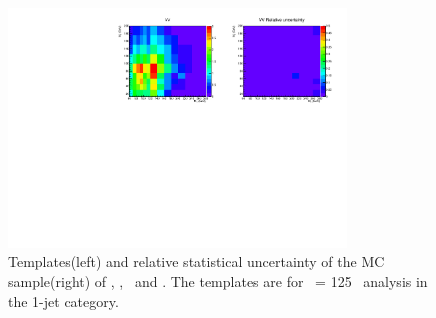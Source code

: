 \begin{figure}[htp]
\includegraphics[width=0.8\textwidth]{figures/2dtemplate_VV_mH125_1j.pdf}
\caption{Templates(left) and relative statistical uncertainty of the MC sample(right) 
of \qqww, \ggww, \topbkg\ and \vv. 
The templates are for \mHi\ = 125 \GeV\ analysis in the 1-jet category.}
\label{fig:2dtemplate_125_1j_2}
\end{figure}

